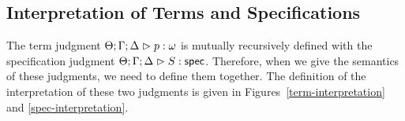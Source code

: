 % 
% 
% 
% 
% 

\subsection{Interpretation of Terms and Specifications}

The term judgment ${\Theta; \Gamma; \Delta} \vartriangleright {p} : {\omega}$ is mutually recursively
defined with the specification judgment ${\Theta; \Gamma; \Delta} \vartriangleright {S} : \mathsf{spec}$. Therefore, when
we give the semantics of these judgments, we need to define them
together. The definition of the interpretation of these two judgments
is given in Figures~\ref{term-interpretation} and
\ref{spec-interpretation}.

